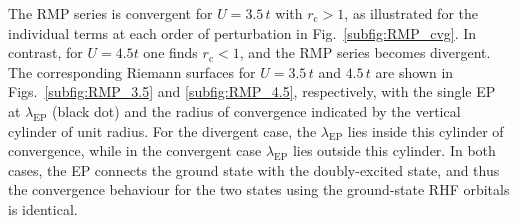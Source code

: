 \documentclass[aps,prb,reprint,noshowkeys,superscriptaddress]{revtex4-1}
\newcommand{\rc}{r_{\text{c}}}
\newcommand{\lep}{\lambda_{\text{EP}}}
\begin{document}
The RMP series is convergent for $U = 3.5\,t$ with $\rc > 1$, as illustrated for the individual terms at each order
of perturbation in Fig.~\ref{subfig:RMP_cvg}.
In contrast, for $U = 4.5t$ one finds $\rc < 1$, and the RMP series becomes divergent.
The corresponding Riemann surfaces for $U = 3.5\,t$ and $4.5\,t$ are shown in Figs.~\ref{subfig:RMP_3.5} and 
\ref{subfig:RMP_4.5}, respectively, with the single EP at $\lep$ (black dot) and the radius of convergence indicated
by the vertical cylinder of unit radius.
For the divergent case, the $\lep$ lies inside this cylinder of convergence, while in the convergent case $\lep$ lies
outside this cylinder.
In both cases, the EP connects the ground state with the doubly-excited state, and thus the convergence behaviour
for the two states using the ground-state RHF orbitals is identical.
\end{document}
